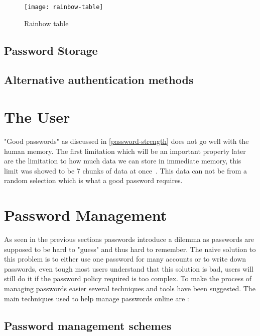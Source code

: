 \begin{figure}[h]
    \texttt{[image: rainbow-table]}
    \caption{Rainbow table}
    \label{rainbow-table}
\end{figure}

\subsection{Password Storage}\label{pw-storage}

\subsection{Alternative authentication methods}


\section{The User}\label{sec:the-user}
"Good passwords" as discussed in \ref{password-strength} does not go well with the human memory. The first limitation which will be an important property later are the limitation to how much data we can store in immediate memory, this limit was showed to be 7 chunks of data at once~\cite{magic-seven_miller}. This data can not be from a random selection which is what a good password requires.   





\section{Password Management}
As seen in the previous sections passwords introduce a dilemma as passwords are supposed to be hard to "guess" and thus hard to remember. The naive solution to this problem is to either use one password for many accounts or to write down passwords, even tough most users understand that this solution is bad, users will still do it if the password policy required is too complex. To make the process of managing passwords easier several techniques and tools have been suggested. The main techniques used to help manage passwords online are \cite{management-strategies}: 


\subsection{Password management schemes}
 
